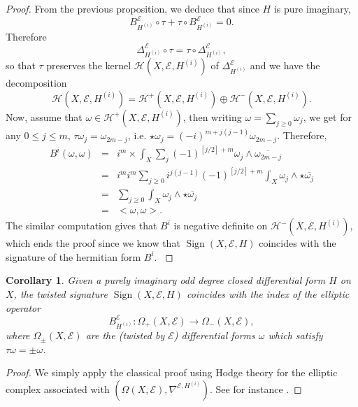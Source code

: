 \documentclass[12pt]{amsart}
\theoremstyle{plain}
\newtheorem{corollary}[theorem]{Corollary}
\theoremstyle{definition}
\theoremstyle{remark}
\begin{document}
\begin{proof}
{{From the previous proposition, we deduce that since $H$ is pure imaginary,
$$
 B^{\mathcal E}_ {H^{(i)}} \circ \tau + \tau \circ B^{\mathcal E}_ {H^{(i)}} = 0.
$$ 
Therefore 
$$
\Delta^{\mathcal E}_ {H^{(i)}} \circ \tau = \tau \circ \Delta^{\mathcal E}_ {H^{(i)}},
$$
so that $\tau$ preserves the kernel $ {\mathcal H} (X, {\mathcal E}, H^{(i)})$ of $\Delta^{\mathcal E}_ {H^{(i)}}$ and we have the decomposition
$$
{\mathcal H} (X, {\mathcal E}, H^{(i)}) = {\mathcal H}^+ (X, {\mathcal E}, H^{(i)}) \oplus {\mathcal H}^- (X, {\mathcal E}, H^{(i)}).
$$
Now, assume that $\omega \in {\mathcal H}^+ (X, {\mathcal E}, H^{(i)})$, then writing $
\omega = \sum_{j\geq 0} \omega_j$, {{we get}} for any $0\leq j\leq m$, $\tau\omega_j = \omega_{2m -j}$, i.e. $\star \omega_j = (-i)^{m+ j(j-1)} \omega_{2m-j}$. Therefore,
\begin{eqnarray*}
 B^i (\omega, \omega) & = & i^m \times  \int_X \sum_{j} (-1)^{[j/2]+m} \omega_j \wedge {\overline{\omega_{2m-j}}}\\
& = & i^m i^m \sum_{j\geq 0} i^{j(j-1)} (-1)^{[j/2]+m} \int_X \omega_j \wedge \star {\overline{\omega_{j}}}\\
& = & \sum_{j\geq 0}\int_X  \omega_j \wedge \star {\overline{\omega_{j}}}\\
& = & <\omega, \omega>.
\end{eqnarray*}
The similar computation gives that $B^i$ is negative definite on ${\mathcal H}^- (X, {\mathcal E}, H^{(i)})$, which ends the proof since we know that ${\operatorname{Sign}} (X, {\mathcal E}, H)$ coincides with the signature
of the hermitian form $B^i$. }}
\end{proof}

\begin{corollary}
Given a purely imaginary odd degree closed differential form $H$ on $X$, the twisted signature ${\operatorname{Sign}} (X, {\mathcal E}, H)$ coincides with the index of the elliptic operator 
$$
B^{\mathcal E}_{H^{(i)}} : \Omega_+ (X, {\mathcal E}) \rightarrow \Omega_- (X, {\mathcal E}),
$$
where $\Omega_\pm (X, {\mathcal E})$ are the (twisted by ${\mathcal E}$) differential forms $\omega$ which satisfy $\tau\omega = \pm \omega$.
\end{corollary}

\begin{proof}
 We simply apply the classical proof using Hodge theory for the elliptic complex associated with $(\Omega (X, {\mathcal E}), \nabla^{{\mathcal E}, H^{(i)}})$. See for instance \cite{BenameurHeitschJDG}.

\end{proof}
\end{document}
